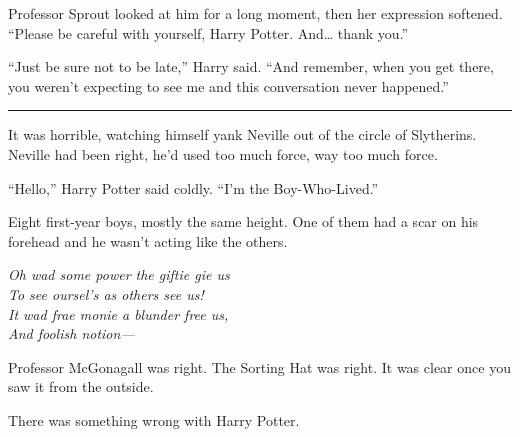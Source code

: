 Professor Sprout looked at him for a long moment, then her expression
softened. ``Please be careful with yourself, Harry Potter. And\ldots{}
thank you.''

``Just be sure not to be late,'' Harry said. ``And remember, when you
get there, you weren't expecting to see me and this conversation never
happened.''

\begin{center}\rule{3in}{0.4pt}\end{center}

It was horrible, watching himself yank Neville out of the circle of
Slytherins. Neville had been right, he'd used too much force, way too
much force.

``Hello,'' Harry Potter said coldly. ``I'm the Boy-Who-Lived.''

Eight first-year boys, mostly the same height. One of them had a scar on
his forehead and he wasn't acting like the others.

\emph{Oh wad some power the giftie gie us}\\\emph{To see oursel's as
others see us!}\\\emph{It wad frae monie a blunder free us,}\\\emph{And
foolish notion---}

Professor McGonagall was right. The Sorting Hat was right. It was clear
once you saw it from the outside.

There was something wrong with Harry Potter.
